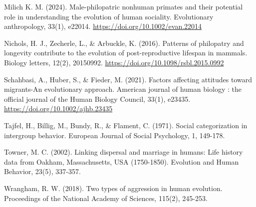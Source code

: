 \documentclass{article}
\begin{document}
\begin{thebibliography}{6}
     Milich K. M. (2024). Male-philopatric nonhuman primates and their potential role in understanding the evolution of human sociality. Evolutionary anthropology, 33(1), e22014. \url{https://doi.org/10.1002/evan.22014}

     Nichols, H. J., Zecherle, L., \& Arbuckle, K. (2016). Patterns of philopatry and longevity contribute to the evolution of post-reproductive lifespan in mammals. Biology letters, 12(2), 20150992. \url{https://doi.org/10.1098/rsbl.2015.0992}

     Schahbasi, A., Huber, S., \& Fieder, M. (2021). Factors affecting attitudes toward migrants-An evolutionary approach. American journal of human biology : the official journal of the Human Biology Council, 33(1), e23435. \url{https://doi.org/10.1002/ajhb.23435}

     Tajfel, H., Billig, M., Bundy, R., \& Flament, C. (1971). Social categorization in intergroup behavior. European Journal of Social Psychology, 1, 149-178.

     Towner, M. C. (2002). Linking dispersal and marriage in humans: Life history data from Oakham, Massachusetts, USA (1750-1850). Evolution and Human Behavior, 23(5), 337-357.

     Wrangham, R. W. (2018). Two types of aggression in human evolution. Proceedings of the National Academy of Sciences, 115(2), 245-253.

\end{thebibliography}
\end{document}
